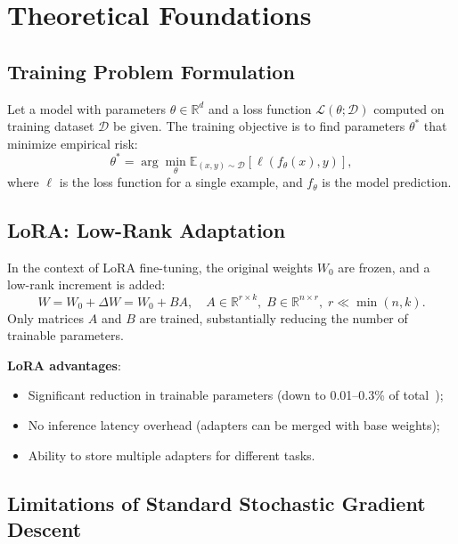 \documentclass[a4paper,12pt]{article}
\begin{document}
\section{Theoretical Foundations}
\label{sec:theory}

\subsection{Training Problem Formulation}

Let a model with parameters $\theta \in \mathbb{R}^d$ and a loss function $\mathcal{L}(\theta; \mathcal{D})$ computed on training dataset $\mathcal{D}$ be given. The training objective is to find parameters $\theta^*$ that minimize empirical risk:
\begin{equation}
    \theta^* = \arg\min_{\theta} \mathbb{E}_{(x,y) \sim \mathcal{D}}[\ell(f_\theta(x), y)],
\end{equation}
where $\ell$ is the loss function for a single example, and $f_\theta$ is the model prediction.

\subsection{LoRA: Low-Rank Adaptation}

In the context of LoRA fine-tuning, the original weights $W_0$ are frozen, and a low-rank increment is added:
\begin{equation}
    W = W_0 + \Delta W = W_0 + BA, \quad A \in \mathbb{R}^{r \times k}, \; B \in \mathbb{R}^{n \times r}, \; r \ll \min(n,k).
\end{equation}
Only matrices $A$ and $B$ are trained, substantially reducing the number of trainable parameters.

\textbf{LoRA advantages}:
\begin{itemize}
    \item Significant reduction in trainable parameters (down to 0.01--0.3\% of total~\cite{hu2021lora});
    \item No inference latency overhead (adapters can be merged with base weights);
    \item Ability to store multiple adapters for different tasks.
\end{itemize}

\subsection{Limitations of Standard Stochastic Gradient Descent}
\end{document}
